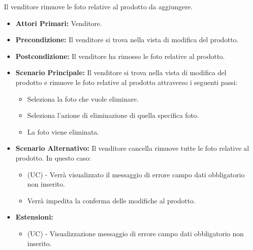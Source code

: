 Il venditore rimuove le foto relative al prodotto da aggiungere.
\begin{itemize}
    \item \textbf{Attori Primari:} Venditore.
    \item \textbf{Precondizione:} Il venditore si trova nella vista di modifica del prodotto.
    \item \textbf{Postcondizione:} Il venditore ha rimosso le foto relative al prodotto.
    \item \textbf{Scenario Principale:} Il venditore si trova nella vista di modifica del prodotto e rimuove le foto relative al prodotto attraverso i seguenti passi:
    \begin{itemize}
        \item Seleziona la foto che vuole eliminare.
        \item Seleziona l'azione di eliminazione di quella specifica foto.
        \item La foto viene eliminata.
    \end{itemize}
    \item \textbf{Scenario Alternativo:} Il venditore cancella rimuove tutte le foto relative al prodotto. In questo caso:
    \begin{itemize}
        \item (UC) - Verrà visualizzato il messaggio di errore campo dati obbligatorio non inserito.
        \item Verrà impedita la conferma delle modifiche al prodotto.
    \end{itemize}
    \item \textbf{Estensioni:}
    \begin{itemize}
        \item (UC) - Visualizzazione messaggio di errore campo dati obbligatorio non inserito.
    \end{itemize}
\end{itemize}


